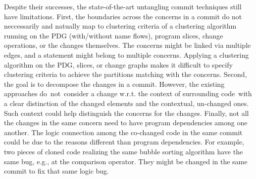 

Despite their successes, the state-of-the-art untangling commit
techniques still have limitations. First, the boundaries across the
concerns in a commit do not neccessarily and natually map to
clustering criteria of a clustering algorithm running on the PDG
(with/without name flows), program slices, change operations, or the
changes themselves. The concerns might be linked via multiple edges,
and a statement might belong to multiple concerns. Applying a
clustering algorithm on the PDG, slices, or change graphs makes it
difficult to specify clustering criteria to achieve the partitions
matching with the concerns.
%
Second, the goal is to decompose the changes in a commit. However, the
existing approaches do~not~consider a change w.r.t. the context of
surrounding code~with a clear distinction of the changed elements
and the contextual, un-changed ones. Such context could help
distinguish the concerns for the changes. Finally, not all the changes
in the same concern need to have program dependencies among one
another. The logic connection among the co-changed code in the same
commit could be due to the reasons different than program
dependencies. For example, two pieces of cloned code realizing the
same bubble sorting algorithm have the same bug, e.g., at the
comparison operator. They might be changed in the same commit to fix
that same logic bug.



